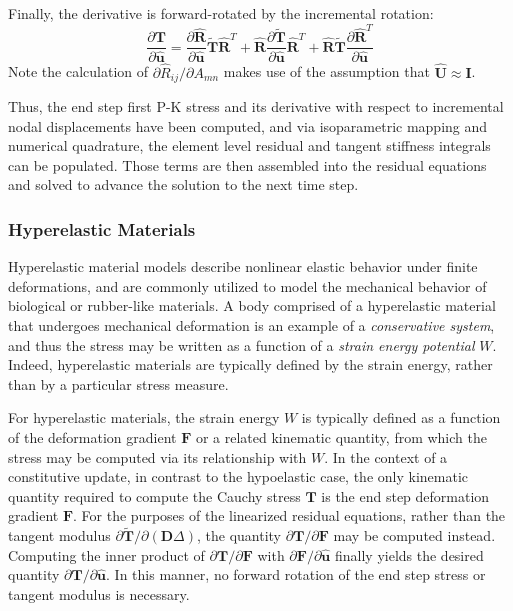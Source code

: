 Finally, the derivative is forward-rotated by the incremental rotation:
\begin{equation}
\frac{\partial {\bm T}}{\partial \hat{\bm u}} = \frac{\partial \hat{\bm R}}{\partial \hat{\bm u}}{\tilde {\bm T}}{\hat{\bm R}}^{T} + {\hat{\bm R}}\frac{\partial \tilde{\bm T}}{\partial \hat{\bm u}}\hat{\bm R}^T + \hat{\bm R}\tilde{\bm T}\frac{\partial \hat{\bm R}^{T}}{\partial \hat{\bm u}}
\end{equation}
Note the calculation of ${\partial \hat{R}_{ij}}/{\partial A_{mn}}$ makes use of the assumption that $\hat{\bm{U}} \approx \bm{I}$.

Thus, the end step first P-K stress and its derivative with respect to incremental nodal displacements have been computed, and via isoparametric mapping and numerical quadrature, the element level residual and tangent stiffness integrals can be populated. Those terms are then assembled into the residual equations and solved to advance the solution to the next time step.

\subsubsection{Hyperelastic Materials}

Hyperelastic material models describe nonlinear elastic behavior under finite deformations, and are commonly utilized to model the mechanical behavior of biological or rubber-like materials. A body comprised of a hyperelastic material that undergoes mechanical deformation is an example of a  \textit{conservative system}, and thus the stress may be written as a function of a \textit{strain energy potential} $W$. Indeed, hyperelastic materials are typically defined by the strain energy, rather than by a particular stress measure.

For hyperelastic materials, the strain energy $W$ is typically defined as a function of the deformation gradient $\bm{F}$ or a related kinematic quantity, from which the stress may be computed via its relationship with $W$. In the context of a constitutive update, in contrast to the hypoelastic case, the only kinematic quantity required to compute the Cauchy stress $\bm{T}$ is the end step deformation gradient $\bm{F}$. For the purposes of the linearized residual equations, rather than the tangent modulus ${\partial \tilde{\bm{T}}}/{\partial (\bm{D}\Delta)}$, the quantity ${\partial \bm{T}}/{\partial \bm{F}}$ may be computed instead. Computing the inner product of ${\partial \bm{T}}/{\partial \bm{F}}$ with $\partial \bm{F}/\partial \hat{\bm{u}}$ finally yields the desired quantity $\partial \bm{T}/\partial \hat{\bm{u}}$. In this manner, no forward rotation of the end step stress or tangent modulus is necessary.

